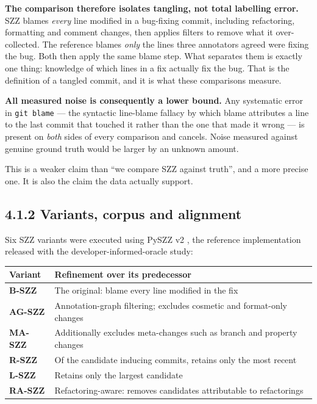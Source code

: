 \textbf{The comparison therefore isolates tangling, not total labelling
error.} SZZ blames \emph{every} line modified in a bug-fixing commit,
including refactoring, formatting and comment changes, then applies
filters to remove what it over-collected. The reference blames
\emph{only} the lines three annotators agreed were fixing the bug. Both
then apply the same blame step. What separates them is exactly one
thing: knowledge of which lines in a fix actually fix the bug. That is
the definition of a tangled commit, and it is what these comparisons
measure.

\textbf{All measured noise is consequently a lower bound.} Any
systematic error in \texttt{git\ blame} --- the syntactic line-blame
fallacy by which blame attributes a line to the last commit that touched
it rather than the one that made it wrong --- is present on \emph{both}
sides of every comparison and cancels. Noise measured against genuine
ground truth would be larger by an unknown amount.

This is a weaker claim than ``we compare SZZ against truth'', and a more
precise one. It is also the claim the data actually support.

\subsection{4.1.2 Variants, corpus and
alignment}\label{variants-corpus-and-alignment}

Six SZZ variants were executed using PySZZ v2
\citep{rosa2023szzvariants}, the reference implementation released with
the developer-informed-oracle study:

\begin{longtable}[]{@{}
  >{\raggedright\arraybackslash}p{}
  >{\raggedright\arraybackslash}p{}@{}}
\toprule\noalign{}
\begin{minipage}[b]{\linewidth}\raggedright
Variant
\end{minipage} & \begin{minipage}[b]{\linewidth}\raggedright
Refinement over its predecessor
\end{minipage} \\
\midrule\noalign{}
\endhead
\bottomrule\noalign{}
\endlastfoot
\textbf{B-SZZ} & The original: blame every line modified in the fix \\
\textbf{AG-SZZ} & Annotation-graph filtering; excludes cosmetic and
format-only changes \\
\textbf{MA-SZZ} & Additionally excludes meta-changes such as branch and
property changes \\
\textbf{R-SZZ} & Of the candidate inducing commits, retains only the
most recent \\
\textbf{L-SZZ} & Retains only the largest candidate \\
\textbf{RA-SZZ} & Refactoring-aware: removes candidates attributable to
refactorings \\
\end{longtable}

